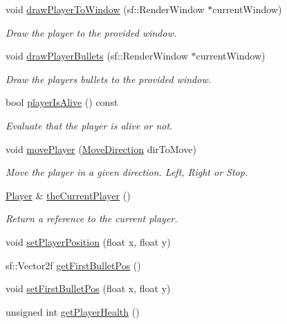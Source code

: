\begin{DoxyCompactItemize}
void \hyperlink{class_player_manager_a8dfbc91721f7c9cfeae80ae7fa89602e}{draw\+Player\+To\+Window} (sf\+::\+Render\+Window $\ast$current\+Window)
\begin{DoxyCompactList}\small\item\em Draw the player to the provided window. \end{DoxyCompactList}\item 
void \hyperlink{class_player_manager_a503d878624b53851c6fa25559630f544}{draw\+Player\+Bullets} (sf\+::\+Render\+Window $\ast$current\+Window)
\begin{DoxyCompactList}\small\item\em Draw the player\textquotesingle{}s bullets to the provided window. \end{DoxyCompactList}\item 
bool \hyperlink{class_player_manager_ab927a10c2c602c42daf2e11eb8861692}{player\+Is\+Alive} () const
\begin{DoxyCompactList}\small\item\em Evaluate that the player is alive or not. \end{DoxyCompactList}\item 
void \hyperlink{class_player_manager_a95358a4f97cf343f5d5d01a440c5dc76}{move\+Player} (\hyperlink{_player_manager_8h_a00ec4eba48da32d6cbdf827185fd3d34}{Move\+Direction} dir\+To\+Move)
\begin{DoxyCompactList}\small\item\em Move the player in a given direction. Left, Right or Stop. \end{DoxyCompactList}\item 
\hyperlink{class_player}{Player} \& \hyperlink{class_player_manager_aa70cd9ab8f7a582c27bef02e12a408e7}{the\+Current\+Player} ()
\begin{DoxyCompactList}\small\item\em Return a reference to the current player. \end{DoxyCompactList}\item 
void \hyperlink{class_player_manager_afbce199fe8a661b8002ae94b8396c7aa}{set\+Player\+Position} (float x, float y)
\item 
sf\+::\+Vector2f \hyperlink{class_player_manager_a1e058a4c38ae4b17a8541feb40247d06}{get\+First\+Bullet\+Pos} ()
\item 
void \hyperlink{class_player_manager_ae654ee04f5d9820cbb4c6b91161cc7a2}{set\+First\+Bullet\+Pos} (float x, float y)
\item 
unsigned int \hyperlink{class_player_manager_a1e1d29acf1a54f18fafe6a2a91c67ee7}{get\+Player\+Health} ()
\end{DoxyCompactItemize}
